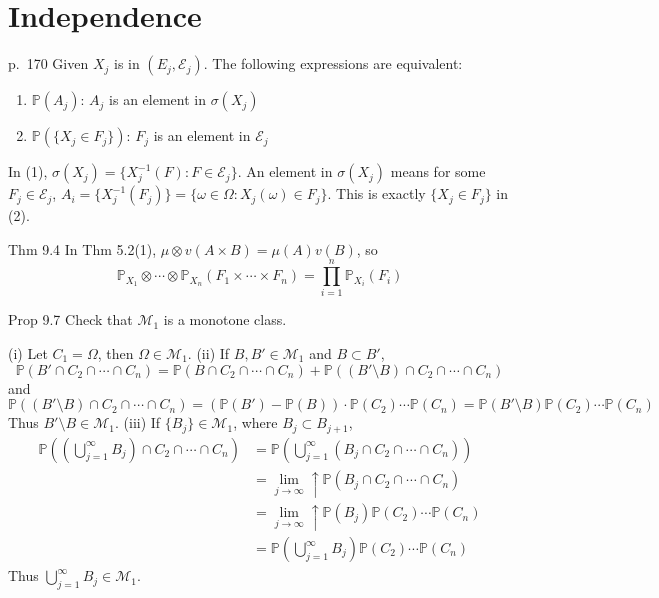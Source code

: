 \setcounter{section}{8}
\section{Independence}

\begin{note}{p.~170}
    Given $X_j$ is in $(E_j,\mathcal{E}_j)$. The following expressions are equivalent:
    \begin{enumerate}
        \item $\mathbb{P}(A_j)$: $A_j$ is an element in $\sigma(X_j)$
        \item $\mathbb{P}(\{X_j\in F_j\})$: $F_j$ is an element in $\mathcal{E}_j$
    \end{enumerate}
    In (1), $\sigma(X_j)=\{X_j^{-1}(F):F\in\mathcal{E}_j\}$. An element in $\sigma(X_j)$ means for some $F_j\in\mathcal{E}_j$, $A_i=\{X_j^{-1}(F_j)\}=\{\omega\in\Omega:X_j(\omega)\in F_j\}$. This is exactly $\{X_j\in F_j\}$ in (2).
\end{note}

\begin{note}{Thm 9.4}
    In Thm 5.2(1), $\mu\otimes v(A\times B)=\mu(A)v(B)$, so 
    \[
    \mathbb{P}_{X_{1}} \otimes \cdots \otimes \mathbb{P}_{X_{n}}\left(F_{1} \times \cdots \times F_{n}\right)=\prod_{i=1}^{n} \mathbb{P}_{X_{i}}\left(F_{i}\right)
    \]
\end{note}

\begin{note}{Prop 9.7}
    Check that $\mathcal{M}_1$ is a monotone class.
    
    (i) Let $C_1=\Omega$, then $\Omega\in\mathcal{M}_1$.  (ii) If $B,B'\in\mathcal{M}_1$ and $B\subset B'$, 
    \[
    \mathbb{P}(B'\cap C_2\cap\cdots\cap C_n)=\mathbb{P}(B\cap C_2\cap\cdots\cap C_n)+\mathbb{P}((B'\setminus B)\cap C_2\cap\cdots\cap C_n)
    \]
    and 
    \[
    \mathbb{P}((B'\setminus B)\cap C_2\cap\cdots\cap C_n)=(\mathbb{P}(B')-\mathbb{P}(B))\cdot\mathbb{P}(C_2)\cdots\mathbb{P}(C_n)=\mathbb{P}(B'\setminus B)\mathbb{P}(C_2)\cdots\mathbb{P}(C_n)
    \]
    Thus $B'\setminus B\in\mathcal{M}_1$. (iii) If $\{B_j\}\in\mathcal{M}_1$, where $B_j\subset B_{j+1}$,
    \[
    \begin{aligned}
        \mathbb{P}\left((\bigcup_{j=1}^{\infty}B_j)\cap C_2\cap\cdots\cap C_n\right)
        &=\mathbb{P}\left(\bigcup_{j=1}^{\infty}(B_j\cap C_2\cap\cdots\cap C_n)\right)\\
        &=\lim_{j\to\infty}\uparrow \mathbb{P}\left(B_j\cap C_2\cap\cdots\cap C_n\right)\\
        &=\lim_{j\to\infty}\uparrow \mathbb{P}(B_j)\mathbb{P}(C_2)\cdots\mathbb{P}(C_n)\\
        &=\mathbb{P}\left(
        \bigcup_{j=1}^{\infty}B_j
        \right)\mathbb{P}(C_2)\cdots\mathbb{P}(C_n)
    \end{aligned}
    \]
    Thus $\bigcup_{j=1}^{\infty}B_j\in\mathcal{M}_1$.
\end{note}

